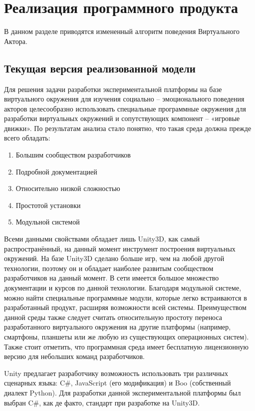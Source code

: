 \chapter{Реализация программного продукта}

В данном разделе приводятся измененный алгоритм поведения Виртуального Актора.

\section{Текущая версия реализованной модели}

Для решения задачи разработки экспериментальной платформы на базе виртуального окружения для изучения социально – эмоционального поведения 
акторов целесообразно использовать специальные программные окружения для разработки виртуальных окружений и сопутствующих компонент – «игровые движки». 
По результатам анализа стало понятно, что такая среда должна прежде всего обладать:

\begin{enumerate}
  \item Большим сообществом разработчиков
  \item Подробной документацией
  \item Относительно низкой сложностью
  \item Простотой установки
  \item Модульной системой
\end{enumerate}

Всеми данными свойствами обладает лишь Unity3D, как самый распространённый, на данный момент инструмент построения виртуальных окружений. 
На базе Unity3D сделано больше игр, чем на любой другой технологии, поэтому он и обладает наиболее развитым сообществом разработчиков на данный момент. 
В сети имеется большое множество документации и курсов по данной технологии. Благодаря модульной системе, можно найти специальные программные модули, 
которые легко встраиваются в разработанный продукт, расширяя возможности всей системы.  Преимуществом данной среды также следует считать относительную 
простоту переноса разработанного виртуального окружения на другие платформы (например, смартфоны, планшеты или же любую из существующих операционных систем). 
Также стоит отметить, что программная среда имеет бесплатную лицензионную версию для небольших команд разработчиков.

Unity предлагает разработчику возможность использовать три различных сценарных языка: C\#, JavaScript (его модификация) и Boo (собственный диалект Python). 
Для разработки данной экспериментальной платформы был выбран C\#, как де факто, стандарт при разработке на Unity3D. 

